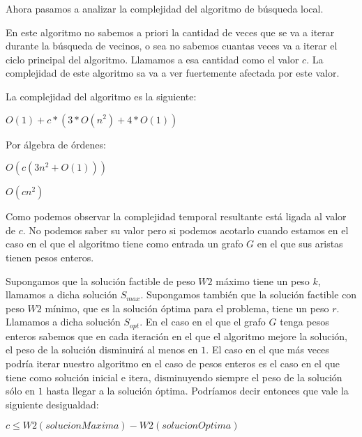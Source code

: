 Ahora pasamos a analizar la complejidad del algoritmo de búsqueda local.

En este algoritmo no sabemos a priori la cantidad de veces que se va a iterar durante la búsqueda de vecinos, o sea no sabemos cuantas veces va a iterar el ciclo principal del algoritmo. Llamamos a esa cantidad como el valor $c$. La complejidad de este algoritmo sa va a ver fuertemente afectada por este valor. 

La complejidad del algoritmo es la siguiente:

$O(1)+c*(3*O(n^2)+4*O(1))$

Por álgebra de órdenes:

$O(c(3n^2+O(1)))$

$O(cn^2)$

Como podemos observar la complejidad temporal resultante está ligada al valor de $c$. No podemos saber su valor pero si podemos acotarlo cuando estamos en el caso en el que el algoritmo tiene como entrada un grafo $G$ en el que sus aristas tienen pesos enteros.

Supongamos que la solución factible de peso $W2$ máximo tiene un peso $k$, llamamos a dicha solución $S_{max}$. Supongamos también que la solución factible con peso $W2$ mínimo, que es la solución óptima para el problema, tiene un peso $r$. Llamamos a dicha solución $S_{opt}$. En el caso en el que el grafo $G$ tenga pesos enteros sabemos que en cada iteración en el que el algoritmo mejore la solución, el peso de la solución disminuirá al menos en $1$. El caso en el que más veces podría iterar nuestro algoritmo en el caso de pesos enteros es el caso en el que tiene como solución inicial e itera, disminuyendo siempre el peso de la solución sólo en $1$ hasta llegar a la solución óptima. Podríamos decir entonces que vale la siguiente desigualdad:

$c \leq W2(solucionMaxima) - W2(solucionOptima)$  